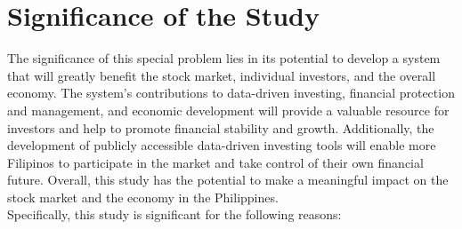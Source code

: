 \section{Significance of the Study}
\label{sec:significance}
The significance of this special problem lies in its potential to develop a 
system that will greatly benefit the stock market, individual investors, and 
the overall economy. The system's contributions to data-driven investing, 
financial protection and management, and economic development will provide 
a valuable resource for investors and help to promote financial stability and growth. 
Additionally, the development of publicly accessible data-driven investing tools 
will enable more Filipinos to participate in the market and take control of their 
own financial future. Overall, this study has the potential to make a meaningful 
impact on the stock market and the economy in the Philippines.
\\Specifically, this study is significant for the following reasons:
